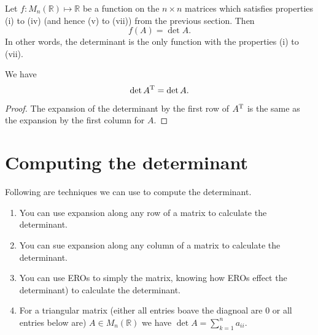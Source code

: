 \begin{theorem}
    Let $f:M_n(\mathbb R)\mapsto\mathbb R$ be a function on the $n\times n$ matrices which satisfies properties (i) to (iv) (and hence (v) to (vii)) from the previous section. Then \[f(A)=\det{A}.\] In other words, the determinant is the only function with the properties (i) to (vii).
\end{theorem}


\begin{theorem}
    We have \[\det{A^{\rm T}}=\det{A}.\]
\end{theorem}

\begin{proof}
    The expansion of the determinant by the first row of $A^{\rm T}$ is the same as the expansion by the first column for $A$.
\end{proof}

\section{Computing the determinant}

Following are techniques we can use to compute the determinant.

\begin{enumerate}
    \item You can use expansion along any row of a matrix to calculate the determinant.
    \item You can sue expansion along any column of a matrix to calculate the determinant.
    \item You can use EROs to simply the matrix, knowing how EROs effect the determinant) to calculate the determinant.
    \item For a triangular matrix (either all entries boave the diagnoal are 0 or all entries below are) $A\in M_n(\mathbb{R})$ we have $\det{A}=\sum_{k=1}^n{a_{ii}}$.
\end{enumerate}

